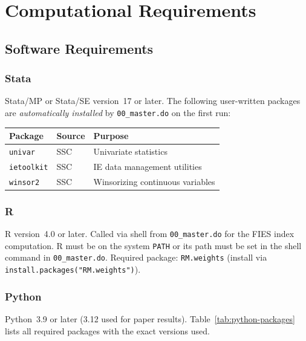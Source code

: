 \documentclass[11pt]{article}
\begin{document}
\section{Computational Requirements}
\label{sec:requirements}

\subsection{Software Requirements}

\subsubsection*{Stata}

Stata/MP or Stata/SE version~17 or later. The following user-written
packages are \emph{automatically installed} by \texttt{00\_master.do}
on the first run:

\begin{table}[h!]
\centering
\begin{tabular}{@{}lll@{}}
\toprule
Package & Source & Purpose \\
\midrule
\texttt{univar}    & SSC & Univariate statistics \\
\texttt{ietoolkit} & SSC & IE data management utilities \\
\texttt{winsor2}   & SSC & Winsorizing continuous variables \\
\bottomrule
\end{tabular}
\end{table}

\subsubsection*{R}

R version~4.0 or later. Called via shell from \texttt{00\_master.do} for
the FIES index computation. R must be on the system \texttt{PATH} or its
path must be set in the shell command in \texttt{00\_master.do}. Required
package: \texttt{RM.weights} (install via
\texttt{install.packages("RM.weights")}).

\subsubsection*{Python}

Python~3.9 or later (3.12 used for paper results). Table~\ref{tab:python-packages}
lists all required packages with the exact versions used.
\end{document}
